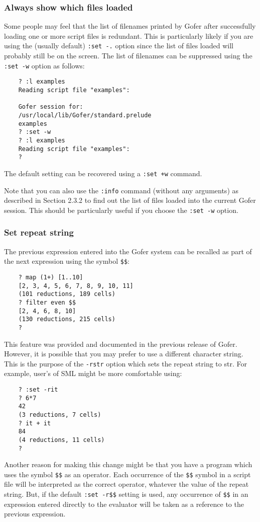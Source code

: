 \subsubsection{Always show which files loaded}
Some people may feel that the list of filenames printed by Gofer after
successfully loading one or more script files is redundant.  This is
particularly likely if you are using the (usually default) \verb":set -."
option since the list of files loaded will probably still be on the
screen.  The list of filenames can be suppressed using the \verb":set -w"
option as follows:
\begin{verbatim}
    ? :l examples
    Reading script file "examples":
                   
    Gofer session for:
    /usr/local/lib/Gofer/standard.prelude
    examples
    ? :set -w
    ? :l examples
    Reading script file "examples":
    ?
\end{verbatim}
The default setting can be recovered using a \verb":set +w" command.

Note that you can also use the \verb":info" command (without any arguments) as
described in Section 2.3.2 to find out the list of files loaded into the
current Gofer session.  This should be particularly useful if you choose
the \verb":set -w" option.


\subsubsection{Set repeat string}
The previous expression entered into the Gofer system can be recalled
as part of the next expression using the symbol \verb"$$":
\begin{verbatim}
    ? map (1+) [1..10]
    [2, 3, 4, 5, 6, 7, 8, 9, 10, 11]
    (101 reductions, 189 cells)
    ? filter even $$
    [2, 4, 6, 8, 10]
    (130 reductions, 215 cells)
    ?
\end{verbatim}
This feature was provided and documented in the previous release of
Gofer.  However, it is possible that you may prefer to use a different
character string.  This is the purpose of the \verb"-rstr" option which sets
the repeat string to str.  For example, user's of SML might be more
comfortable using:
\begin{verbatim}
    ? :set -rit
    ? 6*7
    42
    (3 reductions, 7 cells)
    ? it + it
    84
    (4 reductions, 11 cells)
    ?
\end{verbatim}
Another reason for making this change might be that you have a program
which uses the symbol \verb"$$" as an operator.  Each occurrence of the \verb"$$" symbol
in a script file will be interpreted as the correct operator, whatever
the value of the repeat string.  But, if the default \verb":set -r$$" setting is
used, any occurrence of \verb"$$" in an expression entered directly to the
evaluator will be taken as a reference to the previous expression.

